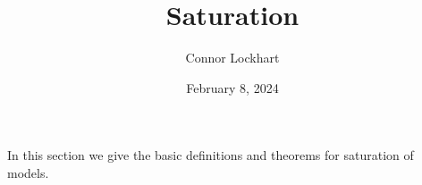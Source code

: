 \documentclass[a4paper]{article}
\title{Saturation}
\date{February 8, 2024}
\author{Connor Lockhart}
\begin{document}
\maketitle
\par{In this section we give the basic definitions and theorems for saturation of models.}
\printbibliography
\end{document}
